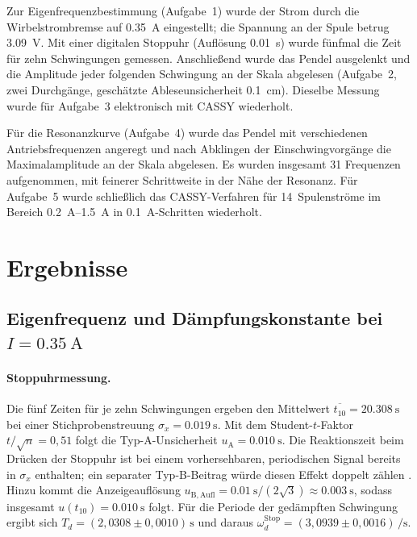 \documentclass[11pt,a4paper]{article}
\begin{document}
Zur Eigenfrequenzbestimmung (Aufgabe~1) wurde der Strom durch die
Wirbelstrombremse auf \SI{0,35}{\ampere} eingestellt; die Spannung
an der Spule betrug \SI{3,09}{\volt}. Mit einer digitalen Stoppuhr
(Auflösung \SI{0,01}{\second}) wurde fünfmal die Zeit für zehn
Schwingungen gemessen. Anschließend wurde das Pendel ausgelenkt und
die Amplitude jeder folgenden Schwingung an der Skala abgelesen
(Aufgabe~2, zwei Durchgänge, geschätzte Ableseunsicherheit
\SI{0,1}{\centi\metre}). Dieselbe Messung wurde für Aufgabe~3
elektronisch mit CASSY wiederholt.

Für die Resonanzkurve (Aufgabe~4) wurde das Pendel mit
verschiedenen Antriebsfrequenzen angeregt und nach Abklingen der
Einschwingvorgänge die Maximalamplitude an der Skala abgelesen. Es
wurden insgesamt 31 Frequenzen aufgenommen, mit feinerer
Schrittweite in der Nähe der Resonanz. Für Aufgabe~5 wurde
schließlich das CASSY-Verfahren für \num{14}~Spulenströme im
Bereich \SIrange{0,2}{1,5}{\ampere} in \SI{0,1}{\ampere}-Schritten
wiederholt.

\section{Ergebnisse}
\subsection{Eigenfrequenz und Dämpfungskonstante bei \texorpdfstring{$I=\SI{0,35}{\ampere}$}{I=0,35 A}}
\paragraph{Stoppuhrmessung.}
Die fünf Zeiten für je zehn Schwingungen ergeben den Mittelwert
$\overline{t_{10}}=\SI{20,308}{\second}$ bei einer Stichprobenstreuung
$\sigma_x=\SI{0,019}{\second}$. Mit dem Student-$t$-Faktor
$t/\sqrt{n}=0{,}51$ folgt die Typ-A-Unsicherheit
$u_\mathrm{A}=\SI{0,010}{\second}$. Die Reaktionszeit beim Drücken
der Stoppuhr ist bei einem vorhersehbaren, periodischen Signal
bereits in $\sigma_x$ enthalten; ein separater Typ-B-Beitrag würde
diesen Effekt doppelt zählen \cite{ABW}. Hinzu kommt die
Anzeigeauflösung
$u_{\mathrm{B,Aufl}}=\SI{0,01}{\second}/(2\sqrt{3})\approx\SI{0,003}{\second}$,
sodass insgesamt $u(t_{10})=\SI{0,010}{\second}$ folgt. Für die
Periode der gedämpften Schwingung ergibt sich
$T_d = (2{,}0308 \pm 0{,}0010)\,\si{\second}$ und daraus
$\omega_d^{\mathrm{Stop}} = (3{,}0939 \pm 0{,}0016)\,\si{\per\second}$.
\end{document}
